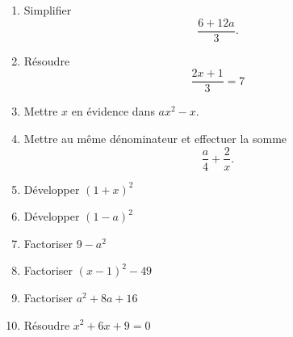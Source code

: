 \begin{exercice}
\begin{multicols}{2}
\begin{enumerate}
            \item
                Simplifier
                \begin{equation*}
                    \frac{ 6+12a }{ 3 }.
                \end{equation*}
            \item
                Résoudre
                \begin{equation*}
                    \frac{ 2x+1 }{ 3 }=7
                \end{equation*}

            \item
                Mettre \( x\) en évidence dans \( ax^2-x\).
            \item
                Mettre au même dénominateur et effectuer la somme
                \begin{equation*}
                    \frac{ a }{ 4 }+\frac{ 2 }{ x }.
                \end{equation*}

            \item
                 Développer \( (1+x)^2\)
             \item
                 Développer \( (1-a)^2\)
             \item
                 Factoriser \( 9-a^2\)
             \item
                 Factoriser \( (x-1)^2-49\)
             \item
                 Factoriser \( a^2+8a+16\)
             \item
                 Résoudre \( x^2+6x+9=0\)

         \end{enumerate}
             \end{multicols}
\end{exercice}
